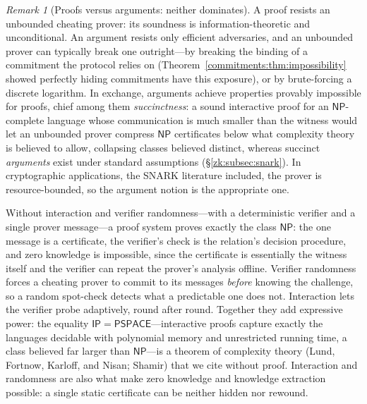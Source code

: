 \documentclass[11pt,a4paper]{article}
\theoremstyle{definition}
\theoremstyle{remark}
\newtheorem{remark}[theorem]{Remark}
\begin{document}
\begin{remark}[Proofs versus arguments: neither dominates]
\label{zk:rem:proofvsarg}
A proof resists an unbounded cheating prover: its soundness is
information-theoretic and unconditional. An argument resists only
efficient adversaries, and an unbounded prover can typically break
one outright---by breaking the binding of a commitment the protocol
relies on (Theorem~\ref{commitments:thm:impossibility} showed
perfectly hiding commitments have this exposure), or by
brute-forcing a discrete logarithm. In exchange, arguments achieve
properties provably impossible for proofs, chief among them
\emph{succinctness}: a sound interactive proof for an
\(\mathsf{NP}\)-complete language whose communication is much smaller
than the witness would let an unbounded prover compress
\(\mathsf{NP}\) certificates below what complexity theory is believed
to allow, collapsing classes believed distinct, whereas succinct
\emph{arguments} exist under standard assumptions
(\S\ref{zk:subsec:snark}). In cryptographic applications, the SNARK
literature included, the prover is resource-bounded, so the argument
notion is the appropriate one.
\end{remark}

Without interaction and verifier randomness---with a deterministic
verifier and a single prover message---a proof
system proves exactly the class \(\mathsf{NP}\): the one message is a
certificate, the verifier's check is the relation's decision
procedure, and zero knowledge is impossible, since the certificate is
essentially the witness itself and the verifier can repeat the
prover's analysis offline. Verifier randomness forces a cheating
prover to commit to its messages \emph{before} knowing the challenge,
so a random spot-check detects what a predictable one does not.
Interaction lets the verifier probe adaptively, round after round.
Together they add expressive power: the equality
\(\mathsf{IP} = \mathsf{PSPACE}\)---interactive proofs capture exactly
the languages decidable with polynomial memory and unrestricted
running time, a class believed far larger than \(\mathsf{NP}\)---is a
theorem of complexity theory (Lund, Fortnow, Karloff, and Nisan;
Shamir) that we cite without proof. Interaction and randomness are
also what make zero knowledge and knowledge extraction possible: a
single static certificate can be neither hidden nor rewound.
\end{document}
